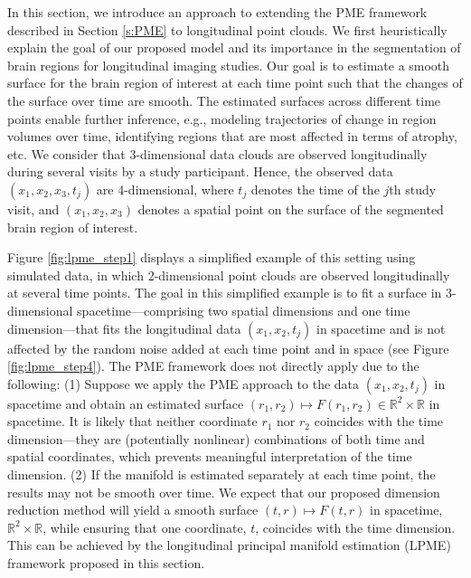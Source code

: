 \documentclass[12pt]{article}
\theoremstyle{definition}
\begin{document}
In this section, we introduce an approach to extending the PME framework described in Section \ref{s:PME} to longitudinal point clouds. We first heuristically explain the goal of our proposed model and its importance in the segmentation of brain regions for longitudinal imaging studies. Our goal is to estimate a smooth surface for the brain region of interest at each time point such that the changes of the surface over time are smooth. The estimated surfaces across different time points enable further inference, e.g., modeling trajectories of change in region volumes over time, identifying regions that are most affected in terms of atrophy, etc. We consider that 3-dimensional data clouds are observed longitudinally during several visits by a study participant. Hence, the observed data $(x_1, x_2, x_3,t_j)$ are 4-dimensional, where $t_j$ denotes the time of the $j$th study visit, and $(x_1, x_2, x_3)$ denotes a spatial point on the surface of the segmented brain region of interest. 

Figure \ref{fig:lpme_step1} displays a simplified example of this setting using simulated data, in which 2-dimensional point clouds are observed longitudinally at several time points. The goal in this simplified example is to fit a surface in 3-dimensional spacetime---comprising two spatial dimensions and one time dimension---that fits the longitudinal data $(x_1, x_2, t_j)$ in spacetime and is not affected by the random noise added at each time point and in space (see Figure \ref{fig:lpme_step4}). The PME framework does not directly apply due to the following: (1) Suppose we apply the PME approach to the data $(x_1, x_2, t_j)$ in spacetime and obtain an estimated surface $(r_1, r_2) \mapsto F(r_1, r_2)\in\mathbb{R}^2\times\mathbb{R}$ in spacetime. It is likely that neither coordinate $r_1$ nor $r_2$ coincides with the time dimension---they are (potentially nonlinear) combinations of both time and spatial coordinates, which prevents meaningful interpretation of the time dimension. (2) If the manifold is estimated separately at each time point, the results may not be smooth over time. We expect that our proposed dimension reduction method will yield a smooth surface $(t,r)\mapsto F(t,r)$ in spacetime, $\mathbb{R}^2\times\mathbb{R}$, while ensuring that one coordinate, $t$, coincides with the time dimension. This can be achieved by the longitudinal principal manifold estimation (LPME) framework proposed in this section.
\end{document}
